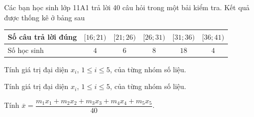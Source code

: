 \begin{ex}%
	Các bạn học sinh lớp 11A1 trả lời 40 câu  hỏi trong một bải kiểm tra. Kết quả được thống kê ở bảng sau
	\begin{center}
		\begin{tabular}{|l|c|c|c|c|c|}
			\hline 
			Số câu trả lời đúng & $[16; 21)$ & $[21; 26)$ & $[26; 31)$ & $[31; 36)$ & $[36; 41)$ \\ 
			\hline 
			Số học sinh & $4$ & $6$ & $8$ & $18$ & $4$ \\ 
			 \hline
		\end{tabular}
	\end{center}
	\begin{listEX}
		\item Tính giá trị đại diện $x_{i}$, $1 \leq i \leq 5$, của từng nhóm  số liệu.
		\item Tính giá trị đại diện $x_{i}$, $1 \leq  i \leq 5$, của từng nhóm số liệu.
		\item Tính $\overline{x}=\dfrac{m_{1} x_{1}+m_{2} x_{2}+m_{3} x_{3}+m_{4}  x_{4}+m_{5} x_{5}}{40}$.
	\end{listEX}
\end{ex}

